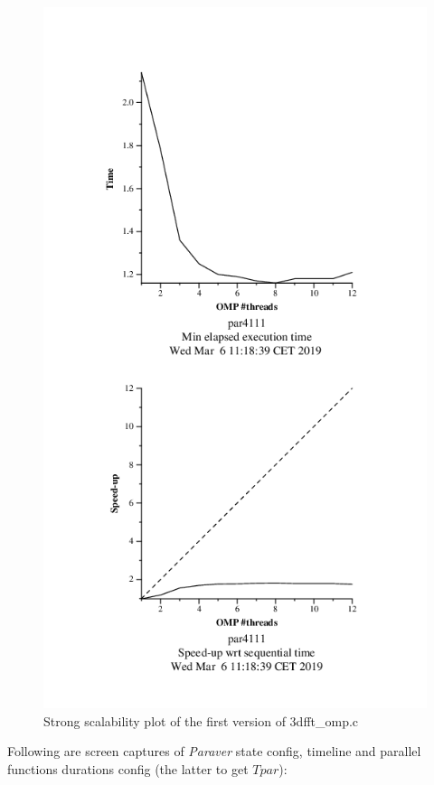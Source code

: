 \documentclass[12]{article}
\begin{document}
\begin{figure}[H]
\centering  
\includegraphics[scale=0.5]{images/3dfft/strongPlot.PNG}
  \caption{Strong scalability plot of the first version of 3dfft\_omp.c}
  \label{fig:3ddftStrongPlot}
\end{figure}

\bigskip
Following are screen captures of \textit{Paraver} state config, timeline and parallel functions durations config (the latter to get $T{par}$):
\end{document}
